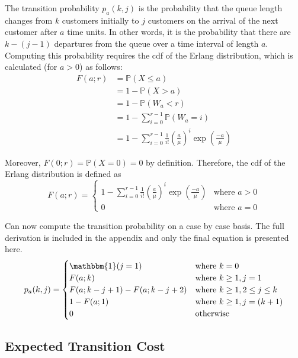 The transition probability $p_{a} (k, j)$ is the probability that the queue length changes from $k$ customers initially to $j$ customers on the arrival of the next customer after $a$ time units. In other words, it is the probability that there are $k - (j - 1)$ departures from the queue over a time interval of length $a$. Computing this probability requires the cdf of the Erlang distribution, which is calculated (for $a > 0$) as follows:
\begin{align*}
	F (a; r) & = \mathbb{P} (X \leq a) \\
	& = 1 - \mathbb{P} (X > a) \\
	& = 1 - \mathbb{P} (W_{a} < r) \\
	& = 1 - \sum_{i = 0}^{r - 1} \mathbb{P} (W_{a} = i) \\
	& = 1 - \sum_{i = 0}^{r - 1} \frac{1}{i!} \left( \frac{a}{\mu} \right)^{i} \exp \left( \frac{-a}{\mu} \right)
\end{align*}

Moreover, $F (0; r) = \mathbb{P} (X = 0) = 0$ by definition. Therefore, the cdf of the Erlang distribution is defined as
\begin{equation}
	F (a; r) = \begin{cases} 1 - \sum_{i = 0}^{r - 1} \frac{1}{i!} \left( \frac{a}{\mu} \right)^{i} \exp \left( \frac{-a}{\mu} \right) & \text{where $a > 0$} \\ 0 & \text{where $a = 0$} \end{cases}
\end{equation}

Can now compute the transition probability on a case by case basis. The full derivation is included in the appendix and only the final equation is presented here.
\begin{equation}
	p_{a} (k, j) = \begin{cases}
		\mathbbm{1} (j = 1) & \text{where $k = 0$} \\
		F (a; k) & \text{where $k \geq 1, j = 1$} \\
		F (a; k - j + 1) - F (a; k - j + 2) & \text{where $k \geq 1, 2 \leq j \leq k$} \\
		1 - F (a; 1) & \text{where $k \geq 1, j = (k + 1)$} \\
		0 & \text{otherwise}
	\end{cases}
\end{equation}

\subsection{Expected Transition Cost}

